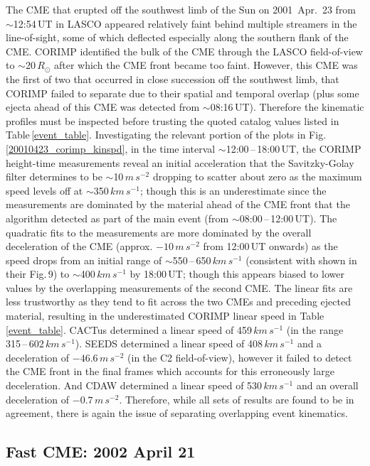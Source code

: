 \documentclass[referee,a4paper,12pt,traditabstract]{swsc}
\begin{document}
\begin{linenumbers}
The CME that erupted off the southwest limb of the Sun on 2001~Apr.~23 from $\sim$12:54\,UT in LASCO appeared relatively faint behind multiple streamers in the line-of-sight, some of which deflected especially along the southern flank of the CME. CORIMP identified the bulk of the CME through the LASCO field-of-view to $\sim$20\,$R_\odot$ after which the CME front became too faint. However, this CME was the first of two that occurred in close succession off the southwest limb, that CORIMP failed to separate due to their spatial and temporal overlap (plus some ejecta ahead of this CME was detected from $\sim$08:16\,UT). Therefore the kinematic profiles must be inspected before trusting the quoted catalog values listed in Table\,\ref{event_table}. Investigating the relevant portion of the plots in Fig.\,\ref{20010423_corimp_kinspd}, in the time interval $\sim$12:00\,--\,18:00\,UT, the CORIMP height-time measurements reveal an initial acceleration that the Savitzky-Golay filter determines to be $\sim$10\,$m\,s^{-2}$ dropping to scatter about zero as the maximum speed levels off at $\sim$350\,$km\,s^{-1}$; though this is an underestimate since the measurements are dominated by the material ahead of the CME front that the algorithm detected as part of the main event (from $\sim$08:00\,--\,12:00\,UT). The quadratic fits to the measurements are more dominated by the overall deceleration of the CME (approx. $-10\,m\,s^{-2}$ from 12:00\,UT onwards) as the speed drops from an initial range of $\sim$550\,--\,650\,$km\,s^{-1}$ (consistent with \citealt{2009A&A...495..325B} shown in their Fig.\,9) to $\sim$400\,$km\,s^{-1}$ by 18:00\,UT; though this appears biased to lower values by the overlapping measurements of the second CME. The linear fits are less trustworthy as they tend to fit across the two CMEs and preceding ejected material, resulting in the underestimated CORIMP linear speed in Table\,\ref{event_table}. CACTus determined a linear speed of 459$\,km\,s^{-1}$ (in the range 315\,--\,602\,$km\,s^{-1}$). SEEDS determined a linear speed of 408$\,km\,s^{-1}$ and a deceleration of $-46.6\,m\,s^{-2}$ (in the C2 field-of-view), however it failed to detect the CME front in the final frames which accounts for this erroneously large deceleration. And CDAW determined a linear speed of 530$\,km\,s^{-1}$ and an overall deceleration of $-0.7\,m\,s^{-2}$. Therefore, while all sets of results are found to be in agreement, there is again the issue of separating overlapping event kinematics.



\subsection{Fast CME: 2002 April 21}
\label{sect_20020421}



\end{linenumbers}
\end{document}
